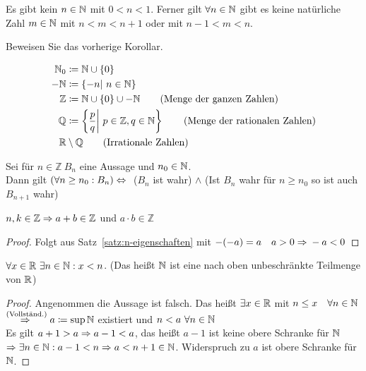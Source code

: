 \begin{korollar}
    \label{korollar:4.2.7}
    Es gibt kein $n\in\mathbb{N}$ mit $0<n<1$. Ferner gilt $\forall n\in\mathbb{N}$ gibt es keine natürliche Zahl $m\in\mathbb{N}$ mit $n<m<n+1$ oder mit $n-1<m<n$.
\end{korollar}
\begin{uebung}
    Beweisen Sie das vorherige Korollar.
\end{uebung}
\begin{notation}[Zahlenmengen]
    \begin{align*}
        \mathbb{N}_0 &\coloneqq \mathbb{N}\cup\left\{0\right\}\\
        \mathbb{-N} &\coloneqq \left\{-n|~n\in\mathbb{N}\right\}\\
        \mathbb{Z} &\coloneqq \mathbb{N}\cup\left\{0\right\}\cup\mathbb{-N} \tag{Menge der ganzen Zahlen}\\
        \mathbb{Q} &\coloneqq\left\{\frac{p}{q}\middle|~p\in\mathbb{Z}, q\in\mathbb{N}\right\} \tag{Menge der rationalen Zahlen}\\
        \mathbb{R}&\setminus\mathbb{Q}\tag{Irrationale Zahlen}
    \end{align*}
\end{notation}
\begin{bemerkung}
    Sei für $n\in\mathbb{Z}~B_n$ eine Aussage und $n_0\in\mathbb{N}$.\\
    Dann gilt $\left(\forall n\geq n_0: B_n\right) \Leftrightarrow{}$ ($B_n$ ist wahr) $\land$ (Ist $B_n$ wahr für $n\geq n_0$ so ist auch $B_{n+1}$ wahr)
\end{bemerkung}

\begin{satz}
    $n,k\in\mathbb{Z} \Rightarrow{} a +b \in\mathbb{Z}$ und $a\cdot b \in\mathbb{Z}$
    \begin{proof}
        Folgt aus Satz~\ref{satz:n-eigenschaften} mit $-(-a) = a\quad a > 0 \Rightarrow{} -a < 0$
    \end{proof}
\end{satz}

\begin{satz}
    \label{satz:von-archimedes}
    $\forall x\in\mathbb{R}~\exists n\in\mathbb{N}: x < n$.
    (Das heißt $\mathbb{N}$ ist eine nach oben unbeschränkte Teilmenge von $\mathbb{R}$)
    \begin{proof}
        Angenommen die Aussage ist falsch. Das heißt $\exists x\in\mathbb{R}$ mit $n\leq x\quad\forall n\in\mathbb{N}$\\
        $\overset{\text{(Vollständ.)}}{\Rightarrow{}} a\coloneqq \sup\mathbb{N}$ existiert und $n<a~\forall n\in\mathbb{N}$\\
        Es gilt $a+1 > a \Rightarrow{} a - 1 < a$, das heißt $a-1$ ist keine obere Schranke für $\mathbb{N}$\\
        $\Rightarrow{} \exists n\in\mathbb{N}: a-1<n \Rightarrow{} a < n + 1 \in\mathbb{N}$. Widerspruch zu $a$ ist obere Schranke für $\mathbb{N}$.
    \end{proof}
\end{satz}

